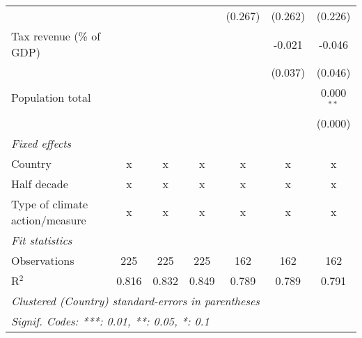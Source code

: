 \begin{tabular}{lcccccc}
                                                  &         &                &                & (0.267)        & (0.262)        & (0.226)\\   
   Tax revenue (\% of GDP)                        &         &                &                &                & -0.021         & -0.046\\   
                                                  &         &                &                &                & (0.037)        & (0.046)\\   
   Population total                               &         &                &                &                &                & 0.000$^{**}$\\   
                                                  &         &                &                &                &                & (0.000)\\   
   \emph{Fixed effects}\\
   Country                                        & x       & x              & x              & x              & x              & x\\  
   Half decade                                    & x       & x              & x              & x              & x              & x\\  
   Type of climate action/measure                 & x       & x              & x              & x              & x              & x\\  
   \midrule \emph{Fit statistics}\\
   Observations                                   & 225     & 225            & 225            & 162            & 162            & 162\\  
   R$^2$                                          & 0.816   & 0.832          & 0.849          & 0.789          & 0.789          & 0.791\\  
   \midrule
   \multicolumn{7}{l}{\emph{Clustered (Country) standard-errors in parentheses}}\\
   \multicolumn{7}{l}{\emph{Signif. Codes: ***: 0.01, **: 0.05, *: 0.1}}\\
\end{tabular}
\par\endgroup



